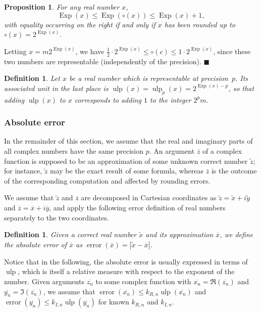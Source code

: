 \documentclass {article}
\newcommand {\corr}[1]{\widetilde {#1}}
\newcommand {\appro}[1]{\overline {#1}}
\newcommand {\Ulp}{{\operatorname {ulp}}}
\DeclareMathOperator{\Exp}{\operatorname {Exp}}
\newcommand{\error}{\operatorname {error}}
\renewcommand {\leq}{\leqslant}
\newtheorem{definition}[theorem]{Definition}
\newtheorem{prop}[theorem]{Proposition}
\newenvironment{proof}{\noindent{\bf Proof:}}{{\hspace* {\fill}$\blacksquare$}}
\begin{document}
\begin {prop}
\label {prop:expround}
For any real number $x$,
\[
\Exp (x) \leq \Exp (\circ (x)) \leq \Exp (x) + 1,
\]
with equality occurring on the right if and only if
$x$ has been rounded up to $\circ (x) = 2^{\Exp (x)}$.
\end {prop}

\begin {proof}
Letting $x = m 2^{\Exp (x)}$, we have
$\frac {1}{2} \cdot 2^{\Exp (x)} \leq \circ (c) \leq 1 \cdot 2^{\Exp (x)}$,
since these two numbers are representable (independently of the precision).
\end {proof}


\begin {definition}
\label {def:ulp}
Let $x$ be a real number which is representable at precision~$p$.
Its associated {\em unit in the last place} is
$\Ulp(x) = \Ulp_p (x) = 2^{\Exp(x) - p}$, so that adding $\Ulp(x)$ to $x$
corresponds to adding $1$ to the integer $2^p m$.
\end {definition}


\subsubsection {Absolute error}

In the remainder of this section, we assume that the real and imaginary parts of
all complex numbers have the same precision $p$.
An argument $\appro z$ of a complex function is supposed to be an
approximation of some unknown correct number $\corr z$; for instance,
$\corr z$ may be the exact result of some formula, whereas
$\appro z$ is the outcome of the corresponding computation and affected
by rounding errors.

We assume that $\corr z$ and $\appro z$ are decomposed in Cartesian
coordinates as $\corr z = \corr x + i \corr y$ and
$\appro z = \appro x + i \appro y$, and apply the following error
definition of real numbers separately to the two coordinates.

\begin {definition}
\label {def:error}
Given a correct real number $\corr x$ and its approximation $\appro x$,
we define the {\em absolute error} of $\appro x$ as
$\error (\appro x) = | \corr x - \appro x |$.
\end {definition}

Notice that in the following, the absolute error is usually expressed in terms
of $\Ulp$, which is itself a relative measure with respect to the exponent of
the number. Given arguments $\appro {z_n}$ to some complex function
with $\appro {x_n} = \Re (\appro {z_n})$ and $\appro {y_n} = \Im (\appro {z_n})$,
we assume that $\error (\appro {x_n}) \leq k_{R, n} \Ulp (\appro {x_n})$
and $\error (\appro {y_n}) \leq k_{I, n} \Ulp (\appro {y_n})$ for known
$k_{R, n}$ and $k_{I, n}$.
\end{document}
